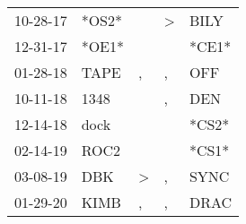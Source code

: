 \begin{supertabular}{p{0.07\textwidth}p{0.06\textwidth}p{0.02\textwidth}p{0.02\textwidth}p{0.06\textwidth}}
 10-28-17\textsuperscript{} &                   *OS2* &               &  \textgreater &  BILY\textsuperscript{} \\
 12-31-17\textsuperscript{} &                   *OE1* &               &               &                   *CE1* \\
 01-28-18\textsuperscript{} &  TAPE\textsuperscript{} &             , &             , &   OFF\textsuperscript{} \\
 10-11-18\textsuperscript{} &  1348\textsuperscript{} &               &             , &   DEN\textsuperscript{} \\
 12-14-18\textsuperscript{} &  dock\textsuperscript{} &               &               &                   *CS2* \\
 02-14-19\textsuperscript{} &  ROC2\textsuperscript{} &               &               &                   *CS1* \\
 03-08-19\textsuperscript{} &   DBK\textsuperscript{} &  \textgreater &             , &  SYNC\textsuperscript{} \\
 01-29-20\textsuperscript{} &  KIMB\textsuperscript{} &             , &             , &  DRAC\textsuperscript{} \\
\end{supertabular}
